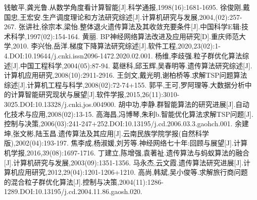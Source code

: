 \documentclass{cjc}
\begin{document}
\begin{thebibliography}{20}
  钱敏平,龚光鲁.从数学角度看计算智能[J].科学通报,1998(16):1681-1695.
  徐俊刚,戴国忠,王宏安.生产调度理论和方法研究综述[J].计算机研究与发展,2004,(02):257-267.
  张讲社,徐宗本,梁怡.整体退火遗传算法及其收敛充要条件[J].中国科学E辑:技术科学,1997(02):154-164.
  黄丽. BP神经网络算法改进及应用研究[D].重庆师范大学,2010.
  李兴怡,岳洋.梯度下降算法研究综述[J].软件工程,2020,23(02):1-4.DOI:10.19644/j.cnki.issn2096-1472.2020.02.001.
  杨维,李歧强.粒子群优化算法综述[J].中国工程科学,2004(05):87-94.
  葛继科,邱玉辉,吴春明等.遗传算法研究综述[J].计算机应用研究,2008(10):2911-2916.
  王剑文,戴光明,谢柏桥等.求解TSP问题算法综述[J].计算机工程与科学,2008(02):72-74+155.
  郭平,王可,罗阿理等.大数据分析中的计算智能研究现状与展望[J].软件学报,2015,26(11):3010-3025.DOI:10.13328/j.cnki.jos.004900.
  胡中功,李静.群智能算法的研究进展[J].自动化技术与应用,2008(02):13-15.
  高海昌,冯博琴,朱利b.智能优化算法求解TSP问题[J].控制与决策,2006(03):241-247+252.DOI:10.13195/j.cd.2006.03.3.gaohch.001.
  余建坤,张文彬,陆玉昌.遗传算法及其应用[J].云南民族学院学报(自然科学版),2002(04):193-197.
  焦李成,杨淑媛,刘芳等.神经网络七十年:回顾与展望[J].计算机学报,2016,39(08):1697-1716.
  丁建立,陈增强,袁著祉.遗传算法与蚂蚁算法的融合[J].计算机研究与发展,2003(09):1351-1356.
  马永杰,云文霞.遗传算法研究进展[J].计算机应用研究,2012,29(04):1201-1206+1210.
  高尚,韩斌,吴小俊等.求解旅行商问题的混合粒子群优化算法[J].控制与决策,2004(11):1286-1289.DOI:10.13195/j.cd.2004.11.86.gaosh.020.

\end{thebibliography}
\end{document}
